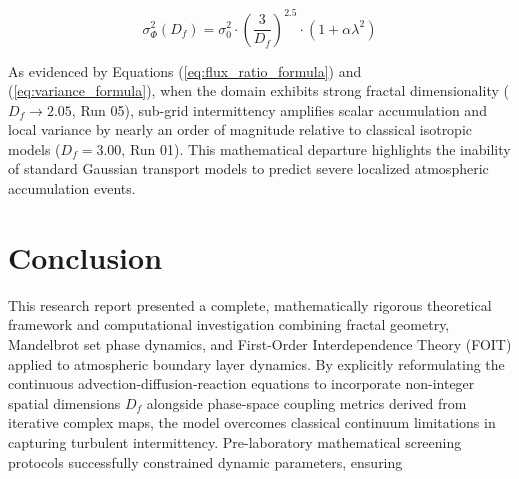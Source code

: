 \documentclass[11pt,a4paper]{article}
\begin{document}
\begin{equation}
\sigma_{\Phi}^2(D_f) = \sigma_{0}^2 \cdot \left( \frac{3}{D_f} \right)^{2.5} \cdot \left( 1 + \alpha \lambda^2 \right)
\label{eq:variance_formula}
\end{equation}

As evidenced by Equations (\ref{eq:flux_ratio_formula}) and (\ref{eq:variance_formula}), when the domain exhibits strong fractal dimensionality ($D_f \to 2.05$, Run 05), sub-grid intermittency amplifies scalar accumulation and local variance by nearly an order of magnitude relative to classical isotropic models ($D_f = 3.00$, Run 01). This mathematical departure highlights the inability of standard Gaussian transport models to predict severe localized atmospheric accumulation events.

\section{Conclusion}

This research report presented a complete, mathematically rigorous theoretical framework and computational investigation combining fractal geometry, Mandelbrot set phase dynamics, and First-Order Interdependence Theory (FOIT) applied to atmospheric boundary layer dynamics. By explicitly reformulating the continuous advection-diffusion-reaction equations to incorporate non-integer spatial dimensions $D_f$ alongside phase-space coupling metrics derived from iterative complex maps, the model overcomes classical continuum limitations in capturing turbulent intermittency. Pre-laboratory mathematical screening protocols successfully constrained dynamic parameters, ensuring

\end{document}
